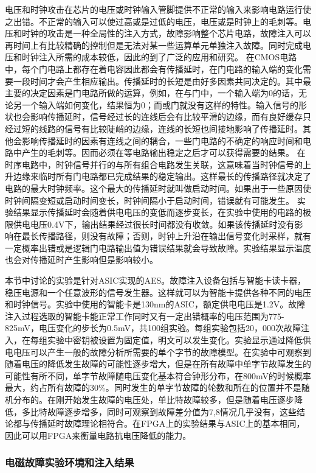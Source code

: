 \documentclass[a4paper,12pt]{article}
\begin{document}
\begin{CJK}{UTF8}{gkai}
电压和时钟攻击在芯片的电压或时钟输入管脚提供不正常的输入来影响电路运行使之出错。不正常的输入可以使过高或是过低的电压，电压或是时钟上的毛刺等。电压和时钟的攻击是一种全局性的注入方式，故障影响整个芯片电路，故障注入可以再时间上有比较精确的控制但是无法对某一些运算单元单独注入故障。同时完成电压和时钟注入所需的成本较低，因此的到了广泛的应用和研究。
在CMOS电路中，每个门电路上都存在着电容因此都会有传播延时，在门电路的输入端的变化需要一段时间才会产生相应输出。传播延时的长短是由好多因素共同决定的。其中最主要的决定因素是门电路所做的运算，例如，在与门中，一个输入端为0的话，无论另一个输入端如何变化，结果恒为0；而或门就没有这样的特性。输入信号的形状也会影响传播延时，信号经过长的连线后会有比较平滑的边缘，而有良好缓存只经过短的线路的信号有比较陡峭的边缘，连线的长短也间接地影响了传播延时。其他会影响传播延时的因素有连线之间的耦合，一些门电路的不确定的响应时间和电路中产生的毛刺等。因而必须在等电路输出稳定之后才可以获得需要的结果。
在时序电路中，时钟信号并行的与所有组合电路发生关联，这意味着当时钟信号的上升边缘来临时所有门电路都已完成结果的稳定输出。这样最长的传播路径就决定了电路的最大时钟频率。这个最大的传播延时就叫做启动时间。如果出于一些原因使时钟间隔变短或启动时间变长，时钟间隔小于启动时间，错误就有可能发生。
实验结果显示传播延时会随着供电电压的变低而逐步变长，在实验中使用的电路的极限供电电压0.4V下，输出结果经过很长时间都没有收敛。如果该传播延时没有影响在最长传播路径，则没有故障；否则，时钟上升沿在输出信号变化时采样，就有一定概率出错或是逻辑门电路输出值为错误结果就会导致故障。实验结果显示温度也会对传播延时产生影响但是影响较小。

本节中讨论的实验是针对ASIC实现的AES。故障注入设备包括与智能卡读卡器，稳压电源和一个任意波形的信号发生器。这样就可以为智能卡提供各种不同的电压和时钟信号。实验中使用的智能卡是130nm的ASIC，额定供电电压是1.2V。故障注入过程选取的智能卡能正常工作同时又有一定出错概率的电压范围为775-825mV，电压变化的步长为0.5mV，共100组实验。每组实验包括20，000次故障注入，在每组实验中密钥被设置为固定值，明文可以发生变化。实验显示通过降低供电电压可以产生一般的故障分析所需要的单个字节的故障模型。在实验中可观察到随着电压的降低发生故障的可能性逐步增大，但是在所有故障中单字节故障发生的可能性有所不同，单字节故障随电压变化基本符合钟形分布，在800mV的时候概率最大，约占所有故障的30\%。同时发生的单字节故障的轮数和所在的位置并不是随机分布的。在刚开始发生故障的电压处，单比特故障较多，但是随着电压逐步降低，多比特故障逐步增多，同时可观察到故障差分值为7,8情况几乎没有，这些结论都与传播延时故障理论相符合。在FPGA上的实验结果与ASIC上的基本相同，因此可以用FPGA来衡量电路抗电压降低的能力。

\subsubsection{电磁故障实验环境和注入结果}


\end{CJK}
\end{document}
